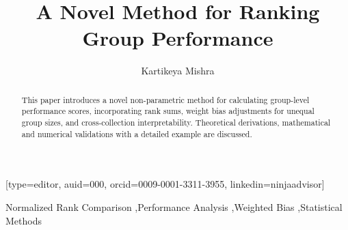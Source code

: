 \documentclass[a4paper,fleqn,review]{cas-sc}
\begin{document}
\let\WriteBookmarks\relax
\def\floatpagepagefraction{1}
\def\textpagefraction{.001}


\title [mode = title]{A \textsf{Novel} Method for Ranking Group Performance}            
\tnotemark[1]


\author[1]{Kartikeya Mishra}[type=editor,
auid=000,
orcid=0009-0001-3311-3955,
linkedin=ninjaadvisor]



\credit{}

\begin{abstract}
	This paper introduces a novel non-parametric method for calculating group-level performance scores, incorporating rank sums, weight bias adjustments for unequal group sizes, and cross-collection interpretability. Theoretical derivations, mathematical and numerical validations with a detailed example are discussed.
\end{abstract}

%

\begin{keywords}
	Normalized Rank Comparison \sep Performance Analysis \sep Weighted Bias  \sep Statistical Methods
\end{keywords}
\maketitle
\end{document}
